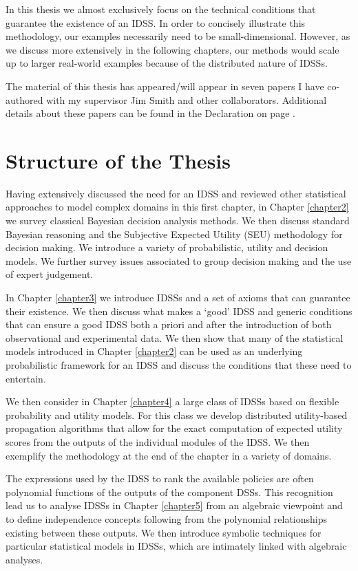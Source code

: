 In this thesis we almost exclusively focus on the technical conditions that guarantee the existence of an IDSS. In order to concisely illustrate this methodology, our examples necessarily need to be small-dimensional. However, as we discuss more extensively in the following chapters, our methods would scale up to larger real-world examples because of the distributed nature of IDSSs.

The material of this thesis has appeared/will appear in seven papers I have co-authored with my supervisor Jim Smith and other collaborators. Additional details about these papers can be found in the Declaration on page \pageref{declaration}. 
\section{Structure of the Thesis}
\label{sec:structure}
Having extensively discussed the need for an IDSS and reviewed other statistical approaches to model complex domains in this first chapter, in Chapter \ref{chapter2} we survey classical Bayesian decision analysis methods. We then discuss  standard Bayesian reasoning and the Subjective Expected Utility (SEU) methodology for decision making. We introduce a variety of probabilistic, utility and decision models. We further survey issues associated to group decision making and the use of expert judgement. 

In Chapter \ref{chapter3} we introduce IDSSs and a set of axioms that can guarantee their existence. We then discuss what makes a \lq{g}ood' IDSS  and generic conditions that can ensure a good IDSS both a priori and after the introduction of both observational and experimental data.  We then show that many of the statistical models introduced in Chapter \ref{chapter2} can be used as an underlying probabilistic framework for an IDSS and discuss the conditions that these need to entertain. 

We then consider in Chapter \ref{chapter4} a large class of IDSSs based on flexible probability and utility models. For this class we develop distributed utility-based propagation algorithms that allow for the exact computation of expected utility scores from the outputs of the individual modules of the IDSS. We then exemplify the methodology at the end of the chapter in a variety of domains. 

The expressions used by the IDSS to rank the available policies are often polynomial functions of the outputs of the component DSSs. This recognition lead us to analyse IDSSs in Chapter \ref{chapter5} from an algebraic viewpoint and to define independence concepts following from the polynomial relationships existing between these outputs. We then introduce symbolic techniques for particular statistical models in IDSSs, which are intimately linked with algebraic analyses. 

